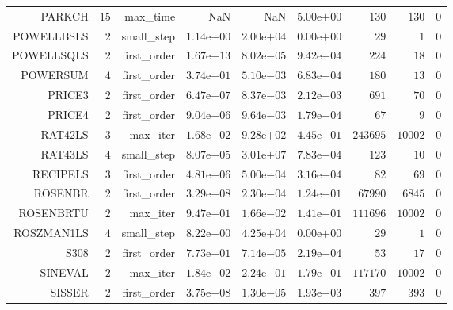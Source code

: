 \begin{longtable}{rrrrrrrrr}
PARKCH & \(    15\) & max\_time &       NaN &       NaN & \( 5.00\)e\(+00\) & \(   130\) & \(   130\) & \(     0\) \\
POWELLBSLS & \(     2\) & small\_step & \( 1.14\)e\(+00\) & \( 2.00\)e\(+04\) & \( 0.00\)e\(+00\) & \(    29\) & \(     1\) & \(     0\) \\
POWELLSQLS & \(     2\) & first\_order & \( 1.67\)e\(-13\) & \( 8.02\)e\(-05\) & \( 9.42\)e\(-04\) & \(   224\) & \(    18\) & \(     0\) \\
POWERSUM & \(     4\) & first\_order & \( 3.74\)e\(+01\) & \( 5.10\)e\(-03\) & \( 6.83\)e\(-04\) & \(   180\) & \(    13\) & \(     0\) \\
PRICE3 & \(     2\) & first\_order & \( 6.47\)e\(-07\) & \( 8.37\)e\(-03\) & \( 2.12\)e\(-03\) & \(   691\) & \(    70\) & \(     0\) \\
PRICE4 & \(     2\) & first\_order & \( 9.04\)e\(-06\) & \( 9.64\)e\(-03\) & \( 1.79\)e\(-04\) & \(    67\) & \(     9\) & \(     0\) \\
RAT42LS & \(     3\) & max\_iter & \( 1.68\)e\(+02\) & \( 9.28\)e\(+02\) & \( 4.45\)e\(-01\) & \(243695\) & \( 10002\) & \(     0\) \\
RAT43LS & \(     4\) & small\_step & \( 8.07\)e\(+05\) & \( 3.01\)e\(+07\) & \( 7.83\)e\(-04\) & \(   123\) & \(    10\) & \(     0\) \\
RECIPELS & \(     3\) & first\_order & \( 4.81\)e\(-06\) & \( 5.00\)e\(-04\) & \( 3.16\)e\(-04\) & \(    82\) & \(    69\) & \(     0\) \\
ROSENBR & \(     2\) & first\_order & \( 3.29\)e\(-08\) & \( 2.30\)e\(-04\) & \( 1.24\)e\(-01\) & \( 67990\) & \(  6845\) & \(     0\) \\
ROSENBRTU & \(     2\) & max\_iter & \( 9.47\)e\(-01\) & \( 1.66\)e\(-02\) & \( 1.41\)e\(-01\) & \(111696\) & \( 10002\) & \(     0\) \\
ROSZMAN1LS & \(     4\) & small\_step & \( 8.22\)e\(+00\) & \( 4.25\)e\(+04\) & \( 0.00\)e\(+00\) & \(    29\) & \(     1\) & \(     0\) \\
S308 & \(     2\) & first\_order & \( 7.73\)e\(-01\) & \( 7.14\)e\(-05\) & \( 2.19\)e\(-04\) & \(    53\) & \(    17\) & \(     0\) \\
SINEVAL & \(     2\) & max\_iter & \( 1.84\)e\(-02\) & \( 2.24\)e\(-01\) & \( 1.79\)e\(-01\) & \(117170\) & \( 10002\) & \(     0\) \\
SISSER & \(     2\) & first\_order & \( 3.75\)e\(-08\) & \( 1.30\)e\(-05\) & \( 1.93\)e\(-03\) & \(   397\) & \(   393\) & \(     0\) \\

\end{longtable}
